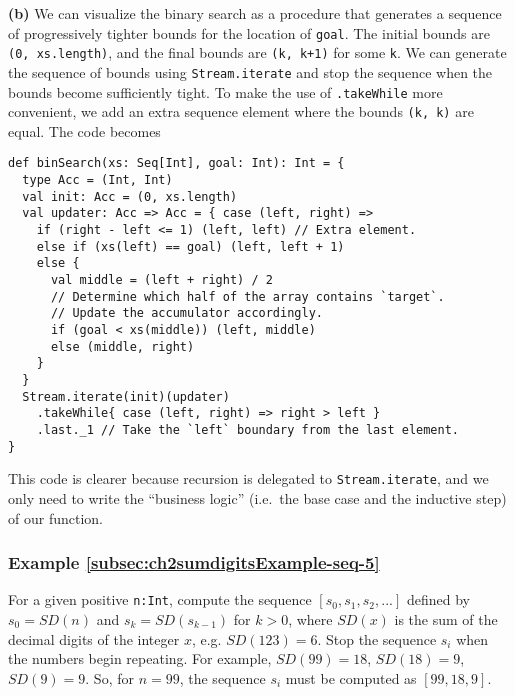 \textbf{(b)} We can visualize the binary search as a procedure that
generates a sequence of progressively tighter bounds for the location
of \lstinline!goal!. The
initial bounds are \lstinline!(0, xs.length)!,
and the final bounds are \lstinline!(k, k+1)!
for some \lstinline!k!.
We can generate the sequence of bounds using \lstinline!Stream.iterate!
and stop the sequence when the bounds become sufficiently tight. To
make the use of \lstinline!.takeWhile!
more convenient, we add an extra sequence element where the bounds
\lstinline!(k, k)! are
equal. The code becomes
\begin{lstlisting}
def binSearch(xs: Seq[Int], goal: Int): Int = {
  type Acc = (Int, Int)
  val init: Acc = (0, xs.length)
  val updater: Acc => Acc = { case (left, right) =>
    if (right - left <= 1) (left, left) // Extra element.
    else if (xs(left) == goal) (left, left + 1)
    else {
      val middle = (left + right) / 2
      // Determine which half of the array contains `target`.
      // Update the accumulator accordingly.
      if (goal < xs(middle)) (left, middle)
      else (middle, right)
    }
  }
  Stream.iterate(init)(updater)
    .takeWhile{ case (left, right) => right > left }
    .last._1 // Take the `left` boundary from the last element.
}
\end{lstlisting}
This code is clearer because recursion is delegated to \lstinline!Stream.iterate!,
and we only need to write the ``business logic'' (i.e.~the base
case and the inductive step) of our function. 

\subsubsection{Example \label{subsec:ch2sumdigitsExample-seq-5}\ref{subsec:ch2sumdigitsExample-seq-5}}

For a given positive \lstinline!n:Int!,
compute the sequence $\left[s_{0},s_{1},s_{2},...\right]$ defined
by $s_{0}=SD(n)$ and $s_{k}=SD(s_{k-1})$ for $k>0$, where $SD(x)$
is the sum of the decimal digits of the integer $x$, e.g. $SD(123)=6$.
Stop the sequence $s_{i}$ when the numbers begin repeating. For example,
$SD(99)=18$, $SD(18)=9$, $SD(9)=9$. So, for $n=99$, the sequence
$s_{i}$ must be computed as $\left[99,18,9\right]$.

